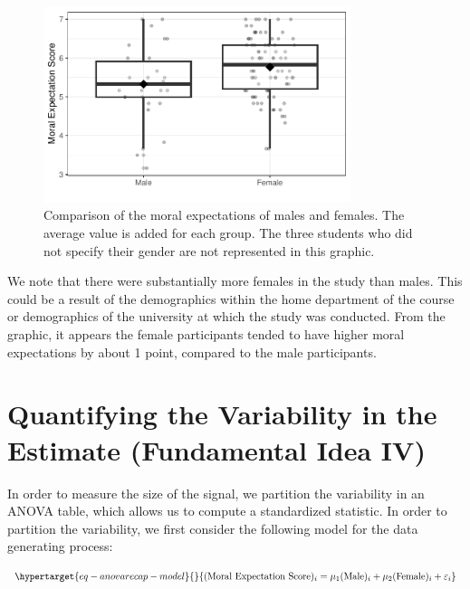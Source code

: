\documentclass[
  letterpaper,
  DIV=11,
  numbers=noendperiod]{scrreprt}
\theoremstyle{plain}
\theoremstyle{definition}
\theoremstyle{definition}
\theoremstyle{remark}
\begin{document}
\begin{figure}

{\centering \includegraphics[width=0.8\textwidth,height=\textheight]{./images/fig-anovarecap-boxplot-1.pdf}

}

\caption{\label{fig-anovarecap-boxplot}Comparison of the moral
expectations of males and females. The average value is added for each
group. The three students who did not specify their gender are not
represented in this graphic.}

\end{figure}

We note that there were substantially more females in the study than
males. This could be a result of the demographics within the home
department of the course or demographics of the university at which the
study was conducted. From the graphic, it appears the female
participants tended to have higher moral expectations by about 1 point,
compared to the male participants.

\hypertarget{quantifying-the-variability-in-the-estimate-fundamental-idea-iv-1}{%
\section{Quantifying the Variability in the Estimate (Fundamental Idea
IV)}\label{quantifying-the-variability-in-the-estimate-fundamental-idea-iv-1}}

In order to measure the size of the signal, we partition the variability
in an ANOVA table, which allows us to compute a standardized statistic.
In order to partition the variability, we first consider the following
model for the data generating process:

\begin{equation}\protect\hypertarget{eq-anovarecap-model}{}{(\text{Moral Expectation Score})_i = \mu_1(\text{Male})_i + \mu_2 (\text{Female})_i + \varepsilon_i}\label{eq-anovarecap-model}\end{equation}
\end{document}

